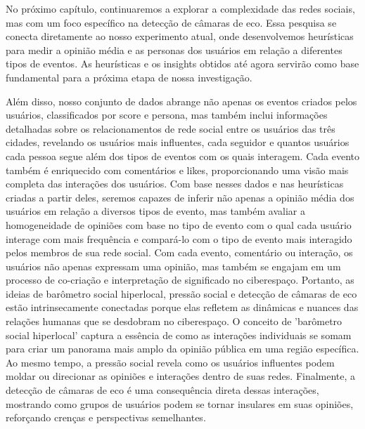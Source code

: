 No próximo capítulo, continuaremos a explorar a complexidade das redes sociais, mas com um foco específico na detecção de câmaras de eco. Essa pesquisa se conecta diretamente ao nosso experimento atual, onde desenvolvemos heurísticas para medir a opinião média e as personas dos usuários em relação a diferentes tipos de eventos. As heurísticas e os insights obtidos até agora servirão como base fundamental para a próxima etapa de nossa investigação.

Além disso, nosso conjunto de dados abrange não apenas os eventos criados pelos usuários, classificados por score e persona, mas também inclui informações detalhadas sobre os relacionamentos de rede social entre os usuários das três cidades, revelando os usuários mais influentes, cada seguidor e quantos usuários cada pessoa segue além dos tipos de eventos com os quais interagem. Cada evento também é enriquecido com comentários e likes, proporcionando uma visão mais completa das interações dos usuários. Com base nesses dados e nas heurísticas criadas a partir deles, seremos capazes de inferir não apenas a opinião média dos usuários em relação a diversos tipos de evento, mas também avaliar a homogeneidade de opiniões com base no tipo de evento com o qual cada usuário interage com mais frequência e compará-lo com o tipo de evento mais interagido pelos membros de sua rede social. Com cada evento, comentário ou interação, os usuários não apenas expressam uma opinião, mas também se engajam em um processo de co-criação e interpretação de significado no ciberespaço. Portanto, as ideias de barômetro social hiperlocal, pressão social e detecção de câmaras de eco estão intrinsecamente conectadas porque elas refletem as dinâmicas e nuances das relações humanas que se desdobram no ciberespaço. O conceito de 'barômetro social hiperlocal' captura a essência de como as interações individuais se somam para criar um panorama mais amplo da opinião pública em uma região específica. Ao mesmo tempo, a pressão social revela como os usuários influentes podem moldar ou direcionar as opiniões e interações dentro de suas redes. Finalmente, a detecção de câmaras de eco é uma consequência direta dessas interações, mostrando como grupos de usuários podem se tornar insulares em suas opiniões, reforçando crenças e perspectivas semelhantes.

